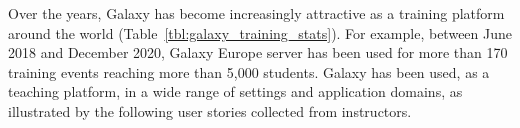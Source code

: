\documentclass[10pt,letterpaper]{article}
\begin{document}

Over the years, Galaxy has become increasingly attractive as a training platform around the world (Table~\ref{tbl:galaxy_training_stats}). For example, between June 2018 and December 2020, Galaxy Europe server has been used for more than 170 training events reaching more than 5,000 students. Galaxy has been used, as a teaching platform, in a wide range of settings and application domains, as illustrated by the following user stories collected from instructors.
\end{document}
